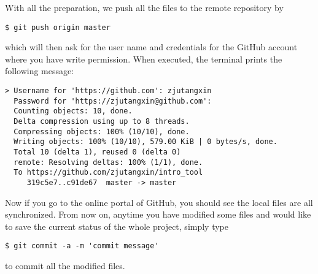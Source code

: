 \documentclass[twoside,12pt,leqno]{article}
\begin{document}
With all the preparation, we push all the files to the remote repository by
\begin{verbatim}
$ git push origin master
\end{verbatim}
which will then ask for the user name and credentials for the GitHub account where you have write permission. When executed, the terminal prints the following message:
\begin{verbatim}
> Username for 'https://github.com': zjutangxin
  Password for 'https://zjutangxin@github.com':
  Counting objects: 10, done.
  Delta compression using up to 8 threads.
  Compressing objects: 100% (10/10), done.
  Writing objects: 100% (10/10), 579.00 KiB | 0 bytes/s, done.
  Total 10 (delta 1), reused 0 (delta 0)
  remote: Resolving deltas: 100% (1/1), done.
  To https://github.com/zjutangxin/intro_tool
     319c5e7..c91de67  master -> master
\end{verbatim}

Now if you go to the online portal of GitHub, you should see the local files are all synchronized. From now on, anytime you have modified some files and would like to save the current status of the whole project, simply type
\begin{verbatim}
$ git commit -a -m 'commit message'
\end{verbatim}
to commit all the modified files.



\end{document}
